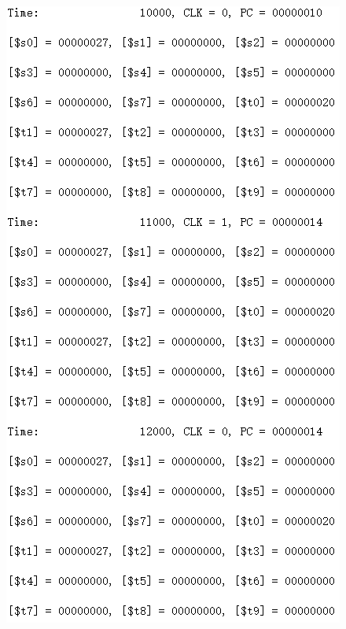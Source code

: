 \documentclass[12pt]{article}
\begin{document}
\begin{figure}[H]
\centering
\includegraphics[scale=1]{R4.jpg}
\end{figure}
\end{document}
